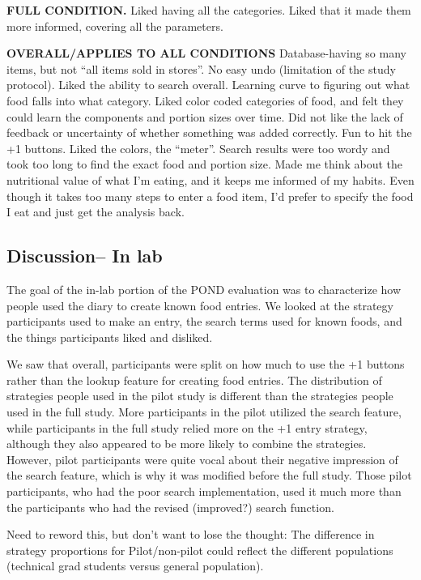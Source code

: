 \textbf{FULL CONDITION.}
Liked having all the categories. Liked that it made them more informed, covering all the parameters. 

\textbf{OVERALL/APPLIES TO ALL CONDITIONS}
Database-having so many items, but not ``all items sold in stores''. No easy undo (limitation of the study protocol). Liked the ability to search overall. Learning curve to figuring out what food falls into what category. Liked color coded categories of food, and felt they could learn the components and portion sizes over time. Did not like the lack of feedback or uncertainty of whether something was added correctly. Fun to hit the +1 buttons. Liked the colors, the ``meter''. Search results were too wordy and took too long to find the exact food and portion size. Made me think about the nutritional value of what I'm eating, and it keeps me informed of my habits. Even though it takes too many steps to enter a food item, I'd prefer to specify the food I eat and just get the analysis back. 


\subsection{Discussion-- In lab}

The goal of the in-lab portion of the POND evaluation was to characterize how people used the diary to create known food entries. We looked at the strategy participants used to make an entry, the search terms used for known foods, and the things participants liked and disliked. 

We saw that overall, participants were split on how much to use the +1 buttons rather than the lookup feature for creating food entries. The distribution of strategies people used in the pilot study is different than the strategies people used in the full study. More participants in the pilot utilized the search feature, while participants in the full study relied more on the +1 entry strategy, although they also appeared to be more likely to combine the strategies. However, pilot participants were quite vocal about their negative impression of the search feature, which is why it was modified before the full study. Those pilot participants, who had the poor search implementation, used it much more than the participants who had the revised (improved?) search function. 

Need to reword this, but don't want to lose the thought: The difference in strategy proportions for Pilot/non-pilot could reflect the different populations (technical grad students versus general population). 

